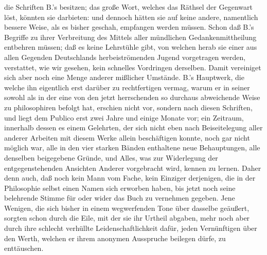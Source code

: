 die Schriften B.'s besitzen; das große Wort,  welches das Räthsel der Gegenwart löst, könnten sie darbieten: und dennoch hätten sie auf keine andere, namentlich  bessere Weise, als es bisher geschah, empfangen werden müssen. Schon daß B.'s Begriffe zu ihrer Verbreitung des Mittels aller mündlichen Gedankenmittheilung entbehren müssen;  daß es keine Lehrstühle gibt, von welchen herab sie einer aus  allen Gegenden Deutschlands herbeiströmenden Jugend vorgetragen werden, verstattet, wie wir gesehen, kein schnelles  Vordringen derselben. Damit vereiniget sich aber noch eine  Menge anderer mißlicher Umstände. B.'s Hauptwerk, die   welche ihn eigentlich erst darüber zu rechtfertigen vermag, warum er in seiner   sowohl als in der  eine von  den jetzt herrschenden so durchaus abweichende Weise zu philosophiren befolgt hat, erschien nicht vor, sondern nach diesen  Schriften, und liegt dem Publico erst zwei Jahre und einige  Monate vor; ein Zeitraum, innerhalb dessen es einem Gelehrten, der sich nicht eben nach Beiseitelegung aller anderer Arbeiten mit diesem Werke allein beschäftigen konnte, noch gar  nicht möglich war, alle in den vier starken Bänden enthaltene  neue Behauptungen, alle denselben beigegebene Gründe, und  Alles, was zur Widerlegung der entgegenstehenden Ansichten  Anderer vorgebracht wird, kennen zu lernen. Daher denn  auch, daß noch kein Mann vom Fache, kein Einziger derjenigen, die in der Philosophie selbst einen Namen sich erworben haben, bis jetzt noch seine belehrende Stimme für oder wider  das Buch zu vernehmen gegeben. Jene Wenigen, die sich  bisher in einem wegwerfenden Tone über dasselbe geäußert,  sorgten schon durch die Eile, mit der sie ihr Urtheil abgaben,  mehr noch aber durch ihre schlecht verhüllte Leidenschaftlichkeit    dafür, jeden Vernünftigen über den Werth, welchen er ihrem anonymen Ausspruche beilegen dürfe, zu enttäuschen.\BUfootnote{%
}
